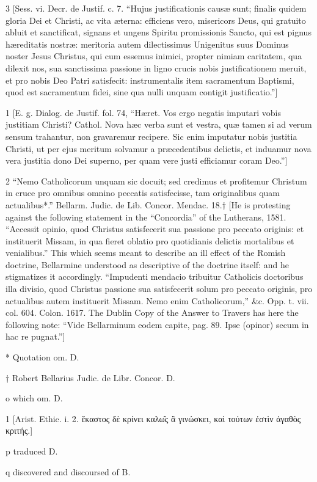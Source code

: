 3
[Sess. vi. Decr. de Justif. c. 7. “Hujus justificationis causæ sunt; finalis quidem gloria Dei et Christi, ac vita æterna: efficiens vero, misericors Deus, qui gratuito abluit et sanctificat, signans et ungens Spiritu promissionis Sancto, qui est pignus hæreditatis nostræ: meritoria autem dilectissimus Unigenitus suus Dominus noster Jesus Christus, qui cum essemus inimici, propter nimiam caritatem, qua dilexit nos, sua sanctissima passione in ligno crucis nobis justificationem meruit, et pro nobis Deo Patri satisfecit: instrumentalis item sacramentum Baptismi, quod est sacramentum fidei, sine qua nulli unquam contigit justificatio.”]

1
[E. g. Dialog. de Justif. fol. 74, “Hæret. Vos ergo negatis imputari vobis justitiam Christi? Cathol. Nova hæc verba sunt et vestra, quæ tamen si ad verum sensum trahantur, non gravaremur recipere. Sic enim imputatur nobis justitia Christi, ut per ejus meritum solvamur a præcedentibus delictis, et induamur nova vera justitia dono Dei superno, per quam vere justi efficiamur coram Deo.”]

2
“Nemo Catholicorum unquam sic docuit; sed credimus et profitemur Christum in cruce pro omnibus omnino peccatis satisfecisse, tam originalibus quam actualibus*.” Bellarm. Judic. de Lib. Concor. Mendac. 18.† [He is protesting against the following statement in the “Concordia” of the Lutherans, 1581. “Accessit opinio, quod Christus satisfecerit sua passione pro peccato originis: et instituerit Missam, in qua fieret oblatio pro quotidianis delictis mortalibus et venialibus.” This which seems meant to describe an ill effect of the Romish doctrine, Bellarmine understood as descriptive of the doctrine itself: and he stigmatizes it accordingly. “Impudenti mendacio tribuitur Catholicis doctoribus illa divisio, quod Christus passione sua satisfecerit solum pro peccato originis, pro actualibus autem instituerit Missam. Nemo enim Catholicorum,” &c. Opp. t. vii. col. 604. Colon. 1617. The Dublin Copy of the Answer to Travers has here the following note: “Vide Bellarminum eodem capite, pag. 89. Ipse (opinor) secum in hac re pugnat.”]

*
Quotation om. D.

†
Robert Bellarius Judic. de Libr. Concor. D.

o
which om. D.

1
[Arist. Ethic. i. 2. ἕκαστος δὲ κρίνει καλω̑ς ἃ γινώσκει, καὶ τούτων ἐστὶν ἀγαθὸς κριτής.]

p
traduced D.

q
discovered and discoursed of B.

